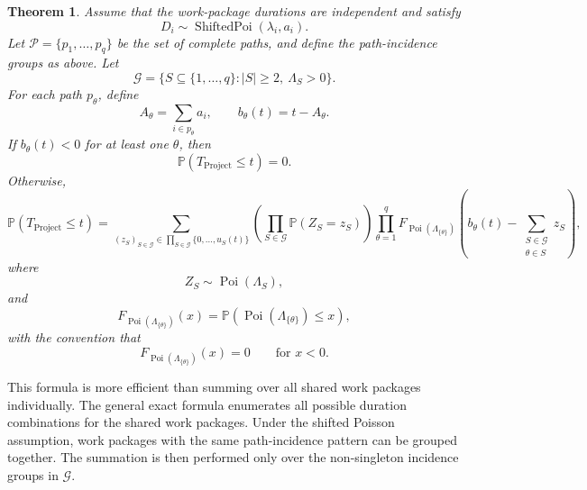 \documentclass[11pt,a4paper]{article}
\newcommand{\pP}{\mathbb{P}}
\newcommand{\1}{\mathbf{1}}
\theoremstyle{definition}
\theoremstyle{plain}
\newtheorem{theorem}{Theorem}[section]
\theoremstyle{remark}
\numberwithin{equation}{section}
\begin{document}
\begin{theorem}
Assume that the work-package durations are independent and satisfy
\[
D_i\sim \operatorname{ShiftedPoi}(\lambda_i,a_i).
\]
Let $\mathcal{P}=\{p_1,\ldots,p_q\}$ be the set of complete paths, and define the path-incidence groups as above. Let
\[
\mathcal{G}
=
\{S\subseteq\{1,\ldots,q\}: |S|\geq 2,\ \Lambda_S>0\}.
\]
For each path $p_\theta$, define
\[
A_\theta=\sum_{i\in p_\theta}a_i,
\qquad
b_\theta(t)=t-A_\theta.
\]
If $b_\theta(t)<0$ for at least one $\theta$, then
\[
\pP(T_{\text{Project}}\leq t)=0.
\]
Otherwise,
\[
\pP(T_{\text{Project}}\leq t)
=
\sum_{(z_S)_{S\in\mathcal{G}}
\in
\prod_{S\in\mathcal{G}}\{0,\ldots,u_S(t)\}}
\left(
\prod_{S\in\mathcal{G}}
\pP(Z_S=z_S)
\right)
\prod_{\theta=1}^q
F_{\operatorname{Poi}(\Lambda_{\{\theta\}})}
\left(
b_\theta(t)
-
\sum_{\substack{S\in\mathcal{G}\\ \theta\in S}}z_S
\right),
\]
where
\[
Z_S\sim\operatorname{Poi}(\Lambda_S),
\]
and
\[
F_{\operatorname{Poi}(\Lambda_{\{\theta\}})}(x)
=
\pP(\operatorname{Poi}(\Lambda_{\{\theta\}})\leq x),
\]
with the convention that
\[
F_{\operatorname{Poi}(\Lambda_{\{\theta\}})}(x)=0
\qquad\text{for }x<0.
\]
\end{theorem}

This formula is more efficient than summing over all shared work packages individually. The general exact formula enumerates all possible duration combinations for the shared work packages. Under the shifted Poisson assumption, work packages with the same path-incidence pattern can be grouped together. The summation is then performed only over the non-singleton incidence groups in $\mathcal{G}$.
\end{document}
